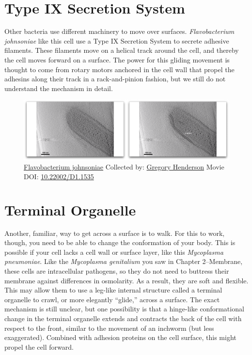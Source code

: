 \documentclass[]{tufte-book}
\begin{document}
\section{Type IX Secretion System}\label{type-ix-secretion-system}

Other bacteria use different machinery to move over surfaces.
\emph{Flavobacterium johnsoniae} like this cell use a Type IX Secretion
System to secrete adhesive filaments. These filaments move on a helical
track around the cell, and thereby the cell moves forward on a surface.
The power for this gliding movement is thought to come from rotary
motors anchored in the cell wall that propel the adhesins along their
track in a rack-and-pinion fashion, but we still do not understand the
mechanism in detail.





\begin{figure}
\includegraphics{movie_stills/6_11} \caption[\protect\hyperlink{tree}{Flavobacterium johnsoniae} Collected
by: \protect\hyperlink{gregory_henderson}{Gregory Henderson} Movie DOI:
\href{https://doi.org/10.22002/D1.1535}{10.22002/D1.1535}]{\protect\hyperlink{tree}{Flavobacterium johnsoniae} Collected
by: \protect\hyperlink{gregory_henderson}{Gregory Henderson} Movie DOI:
\href{https://doi.org/10.22002/D1.1535}{10.22002/D1.1535}}\label{fig:6-11}
\end{figure}

\section{Terminal Organelle}\label{terminal-organelle}

Another, familiar, way to get across a surface is to walk. For this to
work, though, you need to be able to change the conformation of your
body. This is possible if your cell lacks a cell wall or surface layer,
like this \emph{Mycoplasma pneumoniae}. Like the \emph{Mycoplasma
genitalium} you saw in Chapter 2--Membrane, these cells are
intracellular pathogens, so they do not need to buttress their membrane
against differences in osmolarity. As a result, they are soft and
flexible. This may allow them to use a leg-like internal structure
called a terminal organelle to crawl, or more elegantly ``glide,''
across a surface. The exact mechanism is still unclear, but one
possibility is that a hinge-like conformational change in the terminal
organelle extends and contracts the back of the cell with respect to the
front, similar to the movement of an inchworm (but less exaggerated).
Combined with adhesion proteins on the cell surface, this might propel
the cell forward.
\end{document}
